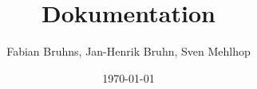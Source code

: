 \documentclass[a4paper,titlepage]{scrartcl}
\begin{document}
	
	\title{Dokumentation}
	\author{Fabian Bruhns, Jan-Henrik Bruhn, Sven Mehlhop} 
	\date{\today} 
	\maketitle
	\tableofcontents
	
	
	
	
	
	
\end{document}
